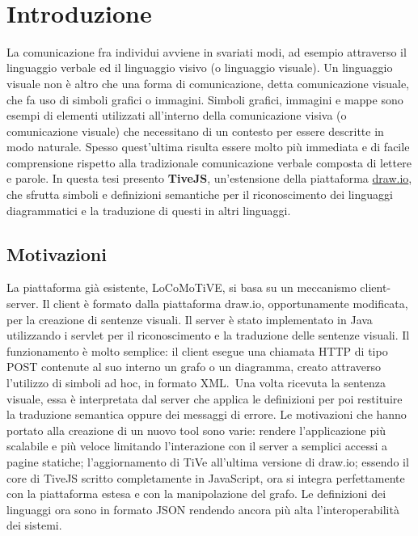 ﻿﻿\chapter{Introduzione}

    La comunicazione fra individui avviene in svariati modi, ad esempio attraverso il linguaggio verbale ed il linguaggio visivo (o linguaggio visuale).
    \newline
    Un linguaggio visuale non è altro che una forma di comunicazione, detta comunicazione visuale, che fa uso di simboli grafici o immagini. Simboli grafici, immagini e mappe sono esempi di elementi utilizzati all'interno della comunicazione visiva (o comunicazione visuale) che necessitano di un contesto per essere descritte in modo naturale. Spesso quest'ultima risulta essere molto più immediata e di facile comprensione rispetto alla tradizionale comunicazione verbale composta di lettere e parole.
    \newline
    In questa tesi presento \textbf{TiveJS}, un'estensione della piattaforma \href{https://www.draw.io/}{draw.io}, che sfrutta  simboli e  definizioni semantiche per il riconoscimento dei linguaggi diagrammatici e la traduzione di questi in altri linguaggi.

    \section{Motivazioni}
        La piattaforma già esistente, LoCoMoTiVE, si basa su un meccanismo client-server.
        \newline
        Il client è formato dalla piattaforma draw.io, opportunamente modificata, per la creazione di sentenze visuali.
        Il server è stato implementato in Java utilizzando i servlet per il riconoscimento e la traduzione delle sentenze visuali.
        Il funzionamento è molto semplice: il client esegue una chiamata HTTP di tipo POST contenute al suo interno un grafo o un diagramma, creato attraverso l'utilizzo di simboli ad hoc, in formato XML.~Una volta ricevuta la sentenza visuale, essa è interpretata dal server che applica le definizioni per poi restituire la traduzione semantica oppure dei messaggi di errore.
        \newline
        Le motivazioni che hanno portato alla creazione di un nuovo tool sono varie: rendere l'applicazione più scalabile e più veloce limitando l'interazione con il server a semplici accessi a pagine statiche; l'aggiornamento di TiVe all'ultima versione di draw.io; essendo il core di TiveJS scritto completamente in JavaScript, ora si integra perfettamente con la piattaforma estesa e con la manipolazione del grafo.
        Le definizioni dei linguaggi ora sono in formato JSON rendendo ancora più alta l'interoperabilità dei sistemi. 

